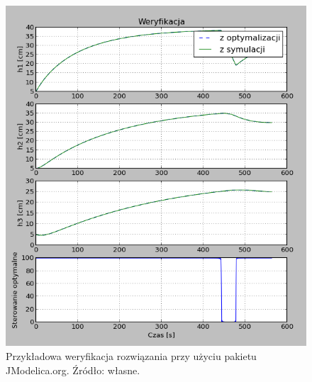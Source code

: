\begin{figure}[htp]
    \centering
    \includegraphics{Grafika/plot_5_5_6-30_30_25-raw-350}
    \caption{Przykładowa weryfikacja rozwiązania przy użyciu pakietu JModelica.org. Źródło: własne.}
    \label{fig:plot556-303035-raw-350}
\end{figure}

